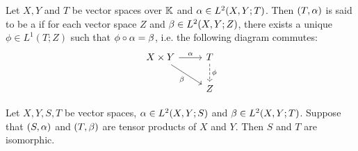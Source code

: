 \documentclass{book}
\begin{document}
	\begin{defn}
		Let $X, Y$ and $T$ be vector spaces over $\mathbb{K}$ and $\alpha \in L^2(X, Y; T)$. Then $(T, \alpha)$ is said to be a  if for each vector space $Z$ and $\beta \in L^2(X, Y; Z)$, there exists a unique $\phi \in L^1(T;Z)$ such that $\phi \circ \alpha = \beta$, i.e. the following diagram commutes:
		\[ 
		\begin{tikzcd}
			X \times Y \arrow[r, "\al"] \arrow[dr, "\be"'] 	
			& T  \arrow[d, dashed, "\phi"] \\
			& Z 
		\end{tikzcd}
		\] 
	\end{defn}
	
	\begin{ex}
		Let $X, Y, S, T$ be vector spaces, $\alpha \in L^2(X, Y; S)$ and $\beta \in L^2(X, Y; T)$. Suppose that $(S, \alpha)$ and $(T, \beta)$ are tensor products of $X$ and $Y$. Then $S$ and $T$ are isomorphic. 
	\end{ex}
	
\end{document}
